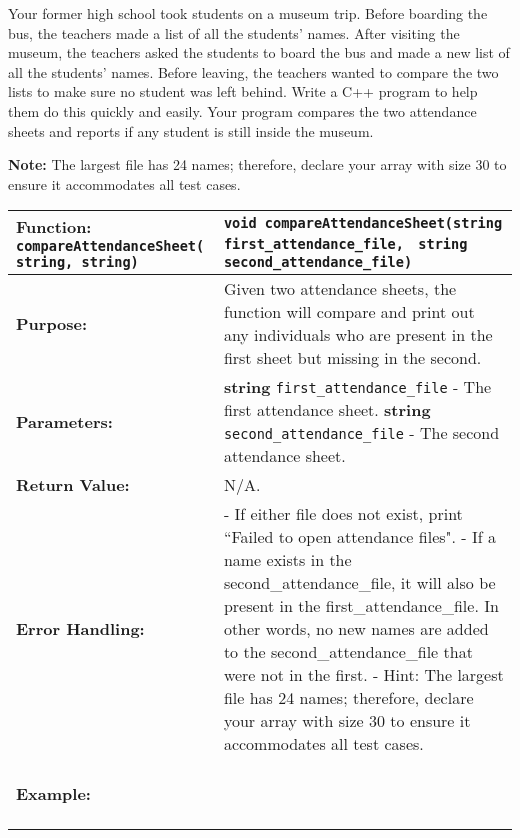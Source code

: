 Your former high school took students on a museum trip. Before boarding the bus, the teachers made a list of all the students' names. After visiting the museum, the teachers asked the students to board the bus and made a new list of all the students' names. Before leaving, the teachers wanted to compare the two lists to make sure no student was left behind. Write a C++ program to help them do this quickly and easily. Your program compares the two attendance sheets and reports if any student is still inside the museum.

\textbf{Note:} The largest file has 24 names; therefore, declare your array with size 30 to ensure it accommodates all test cases.

\newpage
\begin{longtable}{|p{1.7in}|p{4.3in}|}
\hline
\textbf{Function:}  \texttt{compareAttendanceSheet( string, string)} 
& \texttt{void compareAttendanceSheet(string first_attendance_file, } \newline
\texttt{string second_attendance_file)} \\ \hline

\textbf{Purpose:} & Given two attendance sheets, the function will compare and print out any individuals who are present in the first sheet but missing in the second. \\ \hline

\textbf{Parameters:} & 
\textbf{string} \texttt{first\_attendance\_file} - The first attendance sheet. \newline
\textbf{string} \texttt{second\_attendance\_file} - The second attendance sheet.
\\ \hline

\textbf{Return Value:} & 
N/A. \\ \hline

\textbf{Error Handling:} & 
- If either file does not exist, print ``Failed to open attendance files". \newline
- If a name exists in the second\_attendance\_file, it will also be present in the first\_attendance\_file. In other words, no new names are added to the second\_attendance\_file that were not in the first. \newline
- Hint: The largest file has 24 names; therefore, declare your array with size 30 to ensure it accommodates all test cases.
\\ \hline

\textbf{Example:} & 
\begin{example}
\begin{verbatim}



\end{verbatim}
\end{example}
\end{longtable}
